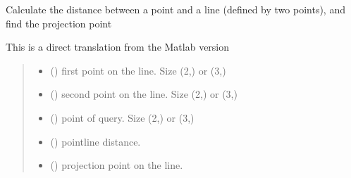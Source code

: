 \documentclass[letterpaper,10pt,english]{sphinxmanual}
\begin{document}
\begin{fulllineitems}
\label{\detokenize{_autosummary/nirfasterff.utils.pointLineDistance:nirfasterff.utils.pointLineDistance}}
\pysigstartsignatures
{}
\pysigstopsignatures
\sphinxAtStartPar
Calculate the distance between a point and a line (defined by two points), and find the projection point

\sphinxAtStartPar
This is a direct translation  from the Matlab version
\begin{quote}\begin{description}
\begin{itemize}
\item {} 
\sphinxAtStartPar
{} () \textendash{} first point on the line. Size (2,) or (3,)

\item {} 
\sphinxAtStartPar
{} () \textendash{} second point on the line. Size (2,) or (3,)

\item {} 
\sphinxAtStartPar
{} () \textendash{} point of query. Size (2,) or (3,)

\end{itemize}

\sphinxAtStartPar
\begin{itemize}
\item {} 
\sphinxAtStartPar
{} () \textendash{} point\sphinxhyphen{}line distance.

\item {} 
\sphinxAtStartPar
{} () \textendash{} projection point on the line.

\end{itemize}


\end{description}\end{quote}

\end{fulllineitems}
\end{document}
